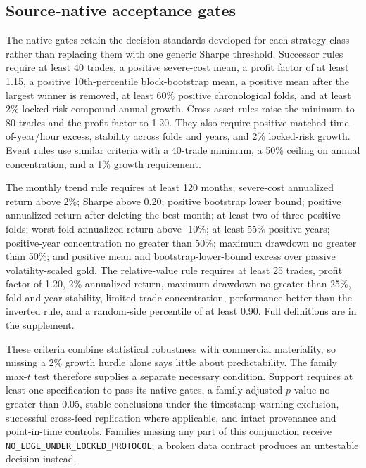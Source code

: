 \subsection{Source-native acceptance gates}\label{subsec:native_gates}

The native gates retain the decision standards developed for each strategy class rather than replacing them with one generic Sharpe threshold. Successor rules require at least 40 trades, a positive severe-cost mean, a profit factor of at least 1.15, a positive 10th-percentile block-bootstrap mean, a positive mean after the largest winner is removed, at least 60\% positive chronological folds, and at least 2\% locked-risk compound annual growth. Cross-asset rules raise the minimum to 80 trades and the profit factor to 1.20. They also require positive matched time-of-year/hour excess, stability across folds and years, and 2\% locked-risk growth. Event rules use similar criteria with a 40-trade minimum, a 50\% ceiling on annual concentration, and a 1\% growth requirement.

The monthly trend rule requires at least 120 months; severe-cost annualized return above 2\%; Sharpe above 0.20; positive bootstrap lower bound; positive annualized return after deleting the best month; at least two of three positive folds; worst-fold annualized return above -10\%; at least 55\% positive years; positive-year concentration no greater than 50\%; maximum drawdown no greater than 50\%; and positive mean and bootstrap-lower-bound excess over passive volatility-scaled gold. The relative-value rule requires at least 25 trades, profit factor of 1.20, 2\% annualized return, maximum drawdown no greater than 25\%, fold and year stability, limited trade concentration, performance better than the inverted rule, and a random-side percentile of at least 0.90. Full definitions are in the supplement.

These criteria combine statistical robustness with commercial materiality, so missing a 2\% growth hurdle alone says little about predictability. The family max-$t$ test therefore supplies a separate necessary condition. Support requires at least one specification to pass its native gates, a family-adjusted $p$-value no greater than 0.05, stable conclusions under the timestamp-warning exclusion, successful cross-feed replication where applicable, and intact provenance and point-in-time controls. Families missing any part of this conjunction receive \texttt{NO\_EDGE\_UNDER\_LOCKED\_PROTOCOL}; a broken data contract produces an untestable decision instead.

